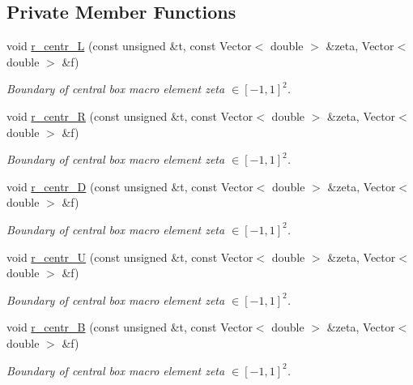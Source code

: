 \subsection*{Private Member Functions}
\begin{DoxyCompactItemize}
\item 
void \hyperlink{classoomph_1_1EighthSphereDomain_adc5634bf44b0689994ad68daf203e11f}{r\+\_\+centr\+\_\+L} (const unsigned \&t, const Vector$<$ double $>$ \&zeta, Vector$<$ double $>$ \&f)
\begin{DoxyCompactList}\small\item\em Boundary of central box macro element zeta $ \in [-1,1]^2 $. \end{DoxyCompactList}\item 
void \hyperlink{classoomph_1_1EighthSphereDomain_a226c7c3bbcc59aa73c1033af523ef653}{r\+\_\+centr\+\_\+R} (const unsigned \&t, const Vector$<$ double $>$ \&zeta, Vector$<$ double $>$ \&f)
\begin{DoxyCompactList}\small\item\em Boundary of central box macro element zeta $ \in [-1,1]^2 $. \end{DoxyCompactList}\item 
void \hyperlink{classoomph_1_1EighthSphereDomain_aa7c38e9c33934b556f59c044654500ce}{r\+\_\+centr\+\_\+D} (const unsigned \&t, const Vector$<$ double $>$ \&zeta, Vector$<$ double $>$ \&f)
\begin{DoxyCompactList}\small\item\em Boundary of central box macro element zeta $ \in [-1,1]^2 $. \end{DoxyCompactList}\item 
void \hyperlink{classoomph_1_1EighthSphereDomain_afda0d6220482758cc0ad81ea848de45b}{r\+\_\+centr\+\_\+U} (const unsigned \&t, const Vector$<$ double $>$ \&zeta, Vector$<$ double $>$ \&f)
\begin{DoxyCompactList}\small\item\em Boundary of central box macro element zeta $ \in [-1,1]^2 $. \end{DoxyCompactList}\item 
void \hyperlink{classoomph_1_1EighthSphereDomain_a3ba94d9786fc6c544d82a392f8bf3dd6}{r\+\_\+centr\+\_\+B} (const unsigned \&t, const Vector$<$ double $>$ \&zeta, Vector$<$ double $>$ \&f)
\begin{DoxyCompactList}\small\item\em Boundary of central box macro element zeta $ \in [-1,1]^2 $. \end{DoxyCompactList}\item 

\end{DoxyCompactItemize}
